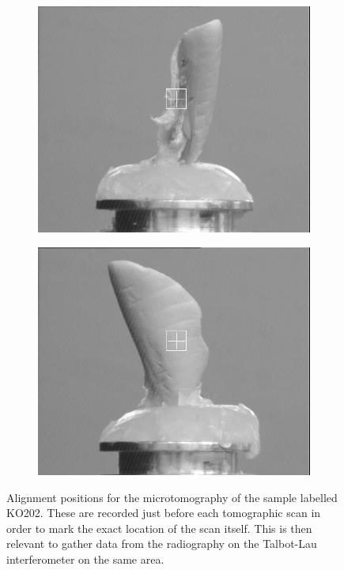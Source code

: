 \begin{figure}[htb]
    \centering
    \begin{subfigure}[b]{.49\textwidth}
    \centering
    \includegraphics[width=\textwidth]{gfx/lung-paper-figures/KO202_LL_control_1_00degree.png}
    \caption{}
    \label{fig:reconstructed}
    \end{subfigure}
    \hfill
    \begin{subfigure}[b]{.49\textwidth}
    \centering
    \includegraphics[width=\textwidth]{gfx/lung-paper-figures/KO202_LL_control_1_90degree.png}
    \caption{}
    \label{fig:lung-alignment}
    \end{subfigure}
    \caption[Alignment for lung microtomography.]{Alignment positions
    for the microtomography of the sample labelled KO202. These are recorded
just before each tomographic scan in order to mark the exact location of the
scan itself. This is then relevant to gather data from the radiography on
the Talbot-Lau interferometer on the same area.}
\end{figure}



